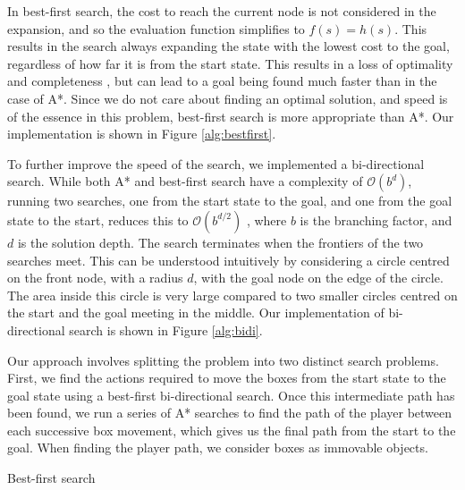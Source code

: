 \documentclass[a4paper,11pt]{article}
\begin{document}
In best-first search, the cost to reach the current node is not considered in
the expansion, and so the evaluation function simplifies to $f(s)=h(s)$. This
results in the search always expanding the state with the lowest cost to the
goal, regardless of how far it is from the start state. This results in a loss
of optimality and completeness \cite{aima}, but can lead to a goal being found
much faster than in the case of A*. Since we do not care about finding an
optimal solution, and speed is of the essence in this problem, best-first search
is more appropriate than A*. Our implementation is shown in Figure
\ref{alg:bestfirst}.

To further improve the speed of the search, we implemented a bi-directional
search. While both A* and best-first search have a complexity of
$\mathcal{O}(b^d)$, running two searches, one from the start state to the goal,
and one from the goal state to the start, reduces this to $\mathcal{O}(b^{d/2})$
\cite{aima}, where $b$ is the branching factor, and $d$ is the solution
depth. The search terminates when the frontiers of the two searches meet. This
can be understood intuitively by considering a circle centred on the front node,
with a radius $d$, with the goal node on the edge of the circle. The area inside
this circle is very large compared to two smaller circles centred on the start
and the goal meeting in the middle. Our implementation of bi-directional search
is shown in Figure \ref{alg:bidi}.

Our approach involves splitting the problem into two distinct search
problems. First, we find the actions required to move the boxes from the start
state to the goal state using a best-first bi-directional search. Once this
intermediate path has been found, we run a series of A* searches to find the
path of the player between each successive box movement, which gives us the
final path from the start to the goal. When finding the player path, we consider
boxes as immovable objects.

\begin{algorithm}
  \DontPrintSemicolon
\caption{Best-first search}
\label{alg:bestfirst}
\end{algorithm}
\end{document}
